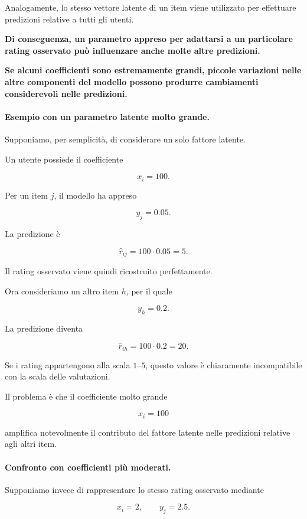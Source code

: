 Analogamente, lo stesso vettore latente di un item
viene utilizzato per effettuare predizioni
relative a tutti gli utenti.

\textbf{Di conseguenza, un parametro appreso per adattarsi
a un particolare rating osservato può influenzare
anche molte altre predizioni.}

\textbf{
Se alcuni coefficienti sono estremamente grandi,
piccole variazioni nelle altre componenti del modello
possono produrre cambiamenti considerevoli
nelle predizioni.}

\paragraph{Esempio con un parametro latente molto grande.}

Supponiamo, per semplicità, di considerare un solo
fattore latente.

Un utente possiede il coefficiente

\[
x_i=100.
\]

Per un item $j$, il modello ha appreso

\[
y_j=0.05.
\]

La predizione è

\[
\widehat r_{ij}
=
100\cdot 0.05
=
5.
\]

Il rating osservato viene quindi ricostruito
perfettamente.

Ora consideriamo un altro item $h$,
per il quale

\[
y_h=0.2.
\]

La predizione diventa

\[
\widehat r_{ih}
=
100\cdot0.2
=
20.
\]

Se i rating appartengono alla scala $1$--$5$,
questo valore è chiaramente incompatibile
con la scala delle valutazioni.

Il problema è che il coefficiente molto grande

\[
x_i=100
\]

amplifica notevolmente il contributo del fattore latente
nelle predizioni relative agli altri item.

\paragraph{Confronto con coefficienti più moderati.}

Supponiamo invece di rappresentare lo stesso rating
osservato mediante

\[
x_i=2,
\qquad
y_j=2.5.
\]

